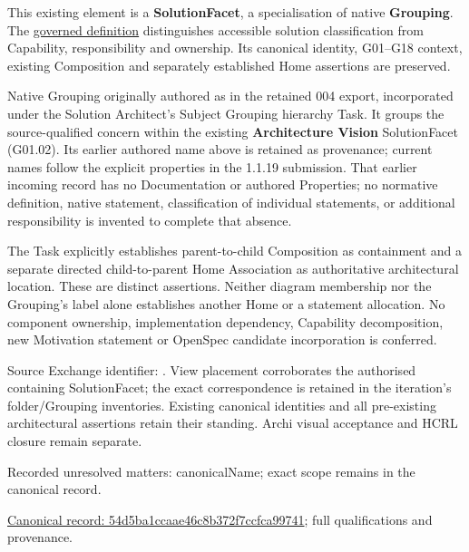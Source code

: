 This existing element is a \textbf{SolutionFacet}, a specialisation of native
\textbf{Grouping}. The \href{\detokenize{../../../../../../../governance/continuum-representation.md#solutionfacet-classification--1119-candidate}}{governed definition}
distinguishes accessible solution classification from Capability, responsibility
and ownership. Its canonical identity, G01–G18 context, existing Composition
and separately established Home assertions are preserved.



Native Grouping originally authored as \texttt{} in the retained 004 export,
incorporated under the Solution Architect's Subject Grouping hierarchy Task.
It groups the source-qualified \texttt{} concern within
the existing \textbf{Architecture Vision} SolutionFacet (G01.02). Its earlier authored name above is retained as provenance; current names
follow the explicit properties in the 1.1.19 submission.
That earlier incoming record has no Documentation or authored Properties; no normative
definition, native statement, classification of individual statements, or
additional responsibility is invented to complete that absence.



The Task explicitly establishes parent-to-child Composition as containment and
a separate directed child-to-parent Home Association as authoritative architectural
location. These are distinct assertions. Neither diagram membership nor the
Grouping's label alone establishes another Home or a statement allocation.
No component ownership, implementation dependency, Capability decomposition,
new Motivation statement or OpenSpec candidate incorporation is conferred.



Source Exchange identifier: \texttt{}. View placement corroborates
the authorised containing SolutionFacet; the exact correspondence is retained in the
iteration's folder/Grouping inventories. Existing canonical identities and all
pre-existing architectural assertions retain their standing. Archi visual
acceptance and HCRL closure remain separate.


{\small Recorded unresolved matters: canonicalName; exact scope remains in the canonical record.}\par
{\footnotesize \href{../../../../../../../continuum/grouping/54d5ba1ccaae46c8b372f7ccfca99741.md}{Canonical record: 54d5ba1ccaae46c8b372f7ccfca99741}; full qualifications and provenance.}\par
